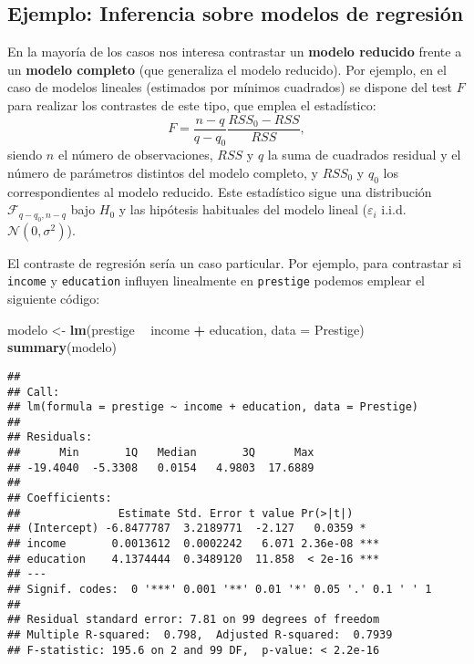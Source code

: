 \documentclass[
]{book}
\newenvironment{Shaded}{\begin{snugshade}}{\end{snugshade}}
\newcommand{\DataTypeTok}[1]{\textcolor[rgb]{0.13,0.29,0.53}{#1}}
\newcommand{\KeywordTok}[1]{\textcolor[rgb]{0.13,0.29,0.53}{\textbf{#1}}}
\newcommand{\NormalTok}[1]{#1}
\newcommand{\OperatorTok}[1]{\textcolor[rgb]{0.81,0.36,0.00}{\textbf{#1}}}
\newcommand{\StringTok}[1]{\textcolor[rgb]{0.31,0.60,0.02}{#1}}
\theoremstyle{break}
\theoremstyle{definition}
\theoremstyle{definition}
\theoremstyle{definition}
\theoremstyle{remark}
\begin{document}
\hypertarget{ejemplo-inferencia-sobre-modelos-de-regresiuxf3n}{%
\subsection{Ejemplo: Inferencia sobre modelos de regresión}\label{ejemplo-inferencia-sobre-modelos-de-regresiuxf3n}}

En la mayoría de los casos nos interesa contrastar un \textbf{modelo reducido}
frente a un \textbf{modelo completo} (que generaliza el modelo reducido).
Por ejemplo, en el caso de modelos lineales (estimados por mínimos cuadrados)
se dispone del test \(F\) para realizar los contrastes de este tipo,
que emplea el estadístico:
\[F=\frac{n - q}{q - q_0}\frac{RSS_0 - RSS}{RSS},\]
siendo \(n\) el número de observaciones, \(RSS\) y \(q\) la suma de cuadrados residual y
el número de parámetros distintos del modelo completo,
y \(RSS_0\) y \(q_0\) los correspondientes al modelo reducido.
Este estadístico sigue una distribución \(\mathcal{F}_{q - q_0, n - q}\)
bajo \(H_0\) y las hipótesis habituales del modelo lineal
(\(\varepsilon_i\) i.i.d. \(\mathcal{N}(0, \sigma^2)\)).

El contraste de regresión sería un caso particular. Por ejemplo,
para contrastar si \texttt{income} y \texttt{education} influyen linealmente en \texttt{prestige}
podemos emplear el siguiente código:

\begin{Shaded}
\begin{Highlighting}[]
\NormalTok{modelo <-}\StringTok{ }\KeywordTok{lm}\NormalTok{(prestige }\OperatorTok{~}\StringTok{ }\NormalTok{income }\OperatorTok{+}\StringTok{ }\NormalTok{education, }\DataTypeTok{data =}\NormalTok{ Prestige)}
\KeywordTok{summary}\NormalTok{(modelo)}
\end{Highlighting}
\end{Shaded}

\begin{verbatim}
## 
## Call:
## lm(formula = prestige ~ income + education, data = Prestige)
## 
## Residuals:
##      Min       1Q   Median       3Q      Max 
## -19.4040  -5.3308   0.0154   4.9803  17.6889 
## 
## Coefficients:
##               Estimate Std. Error t value Pr(>|t|)    
## (Intercept) -6.8477787  3.2189771  -2.127   0.0359 *  
## income       0.0013612  0.0002242   6.071 2.36e-08 ***
## education    4.1374444  0.3489120  11.858  < 2e-16 ***
## ---
## Signif. codes:  0 '***' 0.001 '**' 0.01 '*' 0.05 '.' 0.1 ' ' 1
## 
## Residual standard error: 7.81 on 99 degrees of freedom
## Multiple R-squared:  0.798,  Adjusted R-squared:  0.7939 
## F-statistic: 195.6 on 2 and 99 DF,  p-value: < 2.2e-16
\end{verbatim}
\end{document}
